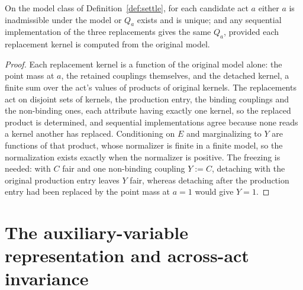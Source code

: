 \begin{proposition}\label{prop:settle-exists}
On the model class of Definition~\ref{def:settle}, for each candidate act $a$ either $a$ is inadmissible under the model or $Q_a$ exists and is unique; and any sequential implementation of the three replacements gives the same $Q_a$, provided each replacement kernel is computed from the original model.
\end{proposition}
\begin{proof}
Each replacement kernel is a function of the original model alone: the point mass at $a$, the retained couplings themselves, and the detached kernel, a finite sum over the act's values of products of original kernels. The replacements act on disjoint sets of kernels, the production entry, the binding couplings and the non-binding ones, each attribute having exactly one kernel, so the replaced product is determined, and sequential implementations agree because none reads a kernel another has replaced. Conditioning on $E$ and marginalizing to $Y$ are functions of that product, whose normalizer is finite in a finite model, so the normalization exists exactly when the normalizer is positive. The freezing is needed: with $C$ fair and one non-binding coupling $Y := C$, detaching with the original production entry leaves $Y$ fair, whereas detaching after the production entry had been replaced by the point mass at $a = 1$ would give $Y = 1$.
\end{proof}

\section{The auxiliary-variable representation and across-act invariance}
\label{sec:invariance}

